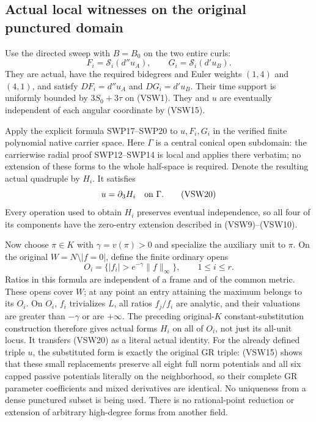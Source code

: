 \subsection{Actual local witnesses on the original punctured domain}

Use the directed sweep with $B=B_0$ on the two entire curls:
\[
 F_i=\mathcal S_i(d''u_A),\qquad
 G_i=\mathcal S_i(d'u_B).
 \tag{VSW19}
\]
They are actual, have the required bidegrees and Euler weights
$(1,4)$ and $(4,1)$, and satisfy $DF_i=d''u_A$ and
$DG_i=d'u_B$.  Their time support is uniformly bounded by
$3S_0+3\tau$ on (VSW1).  They and $u$ are eventually
independent of each angular coordinate by (VSW15).

Apply the explicit formula SWP17--SWP20 to $u,F_i,G_i$ in
the verified finite polynomial native carrier space.  Here
$\Gamma$ is a central conical open subdomain: the carrierwise
radial proof SWP12--SWP14 is local and applies there verbatim;
no extension of these forms to the whole half-space is required.
Denote
the resulting actual quadruple by $H_i$.  It satisfies
\[
                              u=\partial_3H_i
                                  \quad\hbox{on }\Gamma.
 \tag{VSW20}
\]
Every operation used to obtain $H_i$ preserves eventual
independence, so all four of its components have the zero-entry
extension described in (VSW9)--(VSW10).

Now choose $\pi\in K$ with $\gamma=v(\pi)>0$ and specialize
the auxiliary unit to $\pi$.  On the original $W=N\setminus
|f=0|$, define the finite ordinary opens
\[
 O_i=\{|f_i|>e^{-\gamma}\|f\|_\infty\},\qquad
                            1\le i\le r.
 \tag{VSW21}
\]
Ratios in this formula are independent of a frame and of the common
metric.  These opens cover $W$; at any point an entry attaining
the maximum belongs to its $O_i$.  On $O_i$, $f_i$ trivializes
$L$, all ratios $f_j/f_i$ are analytic, and their valuations
are greater than $-\gamma$ or are $+\infty$.
The preceding original-$K$ constant-substitution construction
therefore gives actual forms $H_i$ on all of $O_i$, not just
its all-unit locus.  It transfers (VSW20) as a literal actual
identity.  For the already defined triple $u$, the substituted
form is exactly the original GR triple: (VSW15) shows that these
small replacements preserve all eight full norm potentials and
all six capped passive potentials literally on the neighborhood,
so their complete GR parameter coefficients and mixed derivatives
are identical.  No uniqueness from a dense punctured subset is
being used.  There is no rational-point reduction or extension of
arbitrary high-degree forms from another field.


